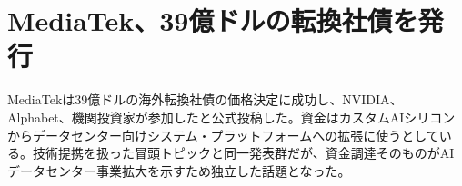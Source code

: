 \section{MediaTek、39億ドルの転換社債を発行}
MediaTekは39億ドルの海外転換社債の価格決定に成功し、NVIDIA、Alphabet、機関投資家が参加したと公式投稿した。資金はカスタムAIシリコンからデータセンター向けシステム・プラットフォームへの拡張に使うとしている。技術提携を扱った冒頭トピックと同一発表群だが、資金調達そのものがAIデータセンター事業拡大を示すため独立した話題となった。
